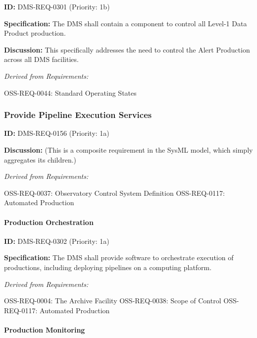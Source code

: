 \documentclass[SE,toc,lsstdraft]{lsstdoc}
\begin{document}
\label{DMS-REQ-0301}
\textbf{ID:} DMS-REQ-0301 (Priority: 1b)

\textbf{Specification:} The DMS shall contain a component to control all Level-1 Data Product production.

\textbf{Discussion: }This specifically addresses the need to control the Alert Production across all DMS facilities.

\emph{Derived from Requirements:}

OSS-REQ-0044:
Standard Operating States \newline

\subsubsection{Provide Pipeline Execution Services}

\label{DMS-REQ-0156}
\textbf{ID:} DMS-REQ-0156 (Priority: 1a)

\textbf{Discussion:}
    (This is a composite requirement in the SysML model, which simply aggregates its children.)

\emph{Derived from Requirements:}

OSS-REQ-0037:
Observatory Control System Definition \newline
OSS-REQ-0117:
Automated Production \newline

\paragraph{Production Orchestration}\hfill  %

\label{DMS-REQ-0302}
\textbf{ID:} DMS-REQ-0302 (Priority: 1a)

\textbf{Specification:} The DMS shall provide software to orchestrate execution of productions, including deploying pipelines on a computing platform.

\emph{Derived from Requirements:}

OSS-REQ-0004:
The Archive Facility \newline
OSS-REQ-0038:
Scope of Control \newline
OSS-REQ-0117:
Automated Production \newline

\paragraph{Production Monitoring}\hfill  %
\end{document}
